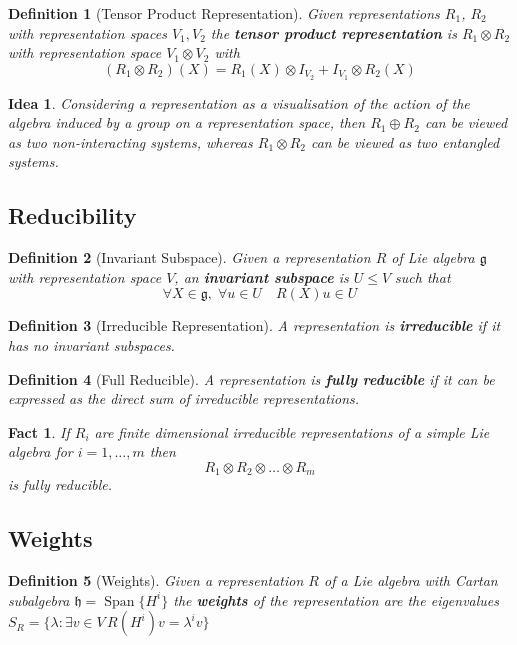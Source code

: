 \documentclass{article}
\newtheorem{definition}{Definition}[subsection]
\newtheorem{fact}{Fact}[subsection]
\newtheorem*{idea}{Idea}
\DeclareMathOperator{\spn}{Span}
\newcommand{\bam}[1]{\textbf{#1}}
\newcommand{\mf}[1]{\mathfrak{#1}}
\newcommand{\set}[1]{\lbrace #1 \rbrace}
\begin{document}
\begin{definition}[Tensor Product Representation]
Given representations $R_1$, $R_2$ with representation spaces $V_1, V_2$ the \bam{tensor product representation} is $R_1 \otimes R_2$ with representation space $V_1 \otimes V_2$ with
\[
(R_1 \otimes R_2)(X)=R_1(X)\otimes I_{V_2}+I_{V_1}\otimes R_2(X)
\]
\end{definition}

\begin{idea}
Considering a representation as a visualisation of the action of the algebra induced by a  group on a representation space, then $R_1 \oplus R_2$ can be viewed as two non-interacting systems, whereas $R_1 \otimes R_2$ can be viewed as two entangled systems.
\end{idea}

\subsection{Reducibility}
\begin{definition}[Invariant Subspace]
Given a representation $R$ of Lie algebra $\mf{g}$ with representation space $V$, an \bam{invariant subspace} is $U\leq V$ such that
\[
\forall X\in\mf{g}, \; \forall u\in U \quad R\left(X\right)u\in U
\]
\end{definition}

\begin{definition}[Irreducible Representation]
A representation is \bam{irreducible} if it has no invariant subspaces. 
\end{definition}

\begin{definition}[Full Reducible]
A representation is \bam{fully reducible} if it can be expressed as the direct sum of irreducible representations. 
\end{definition}

\begin{fact}
If $R_i$ are finite dimensional irreducible representations of a simple Lie algebra for $i=1,\dots,m$ then
\[
R_1 \otimes R_2 \otimes \dots \otimes R_m
\]
is fully reducible. 
\end{fact}

\subsection{Weights}
\begin{definition}[Weights]
Given a representation $R$ of a Lie algebra with Cartan subalgebra $\mf{h}=\spn\set{ H^i }$ the \bam{weights} of the representation are the eigenvalues $S_R=\set{ \lambda : \exists v\in V \, R(H^i)v=\lambda^i v}$
\end{definition}
\end{document}
